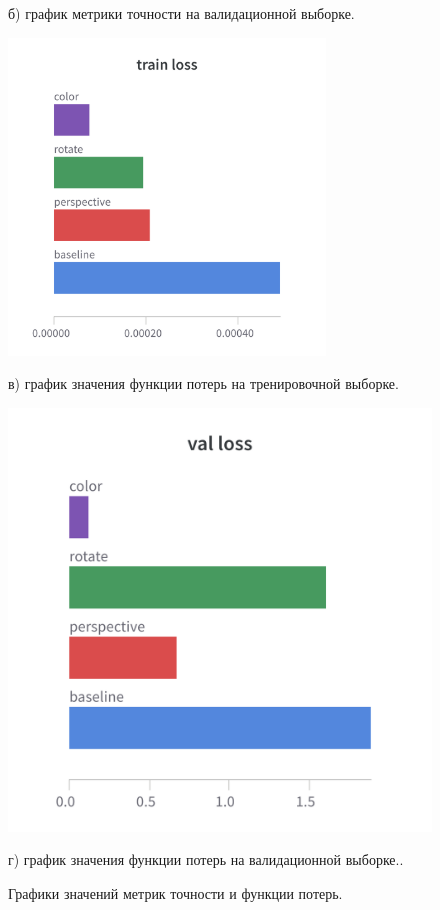 \documentclass[14pt, russian]{scrartcl}
\begin{document}
\begin{figure}[H]
\begin{minipage}[t]{.4\linewidth}
		\caption*{б) график метрики точности на валидационной выборке.}
	\end{minipage}
	\noindent
	\begin{minipage}[t]{.4\linewidth}
		\centering
		\includegraphics[width=0.75\textwidth]{./img/train_loss.png}
		\caption*{в) график значения функции потерь на тренировочной выборке.}
	\end{minipage}
	\begin{minipage}[t]{.4\textwidth}
		\centering
		\includegraphics[width=0.75\linewidth]{./img/val_loss.png}
		\caption*{г) график значения функции потерь на валидационной выборке..}
	\end{minipage}
	\caption{Графики значений метрик точности и функции потерь.}
	\label{fig:logsbatch}
\end{figure}
\end{document}
